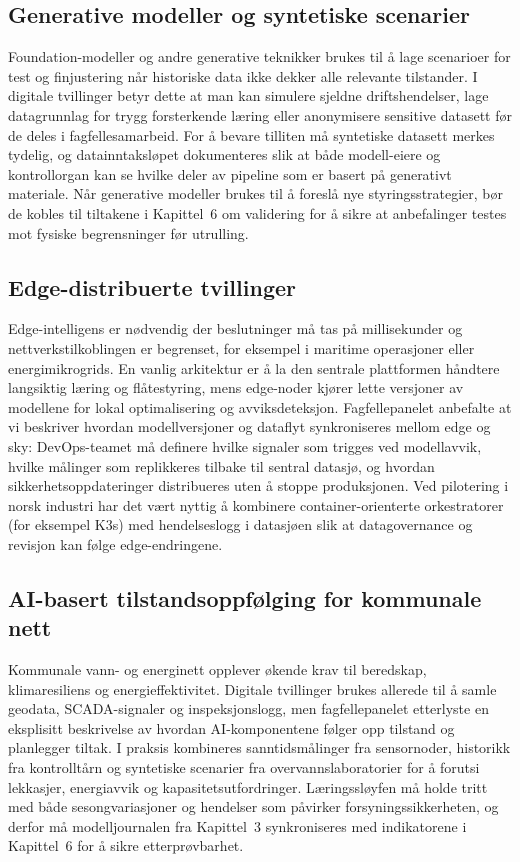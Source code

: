 \subsection{Generative modeller og syntetiske scenarier}
Foundation-modeller og andre generative teknikker brukes til å lage scenarioer for test og finjustering når historiske data ikke dekker alle relevante tilstander.\citep{bommasani2021opportunities} I digitale tvillinger betyr dette at man kan simulere sjeldne driftshendelser, lage datagrunnlag for trygg forsterkende læring eller anonymisere sensitive datasett før de deles i fagfellesamarbeid. For å bevare tilliten må syntetiske datasett merkes tydelig, og datainntaksløpet dokumenteres slik at både modell-eiere og kontrollorgan kan se hvilke deler av pipeline som er basert på generativt materiale. Når generative modeller brukes til å foreslå nye styringsstrategier, bør de kobles til tiltakene i Kapittel~6 om validering for å sikre at anbefalinger testes mot fysiske begrensninger før utrulling.

\subsection{Edge-distribuerte tvillinger}
Edge-intelligens er nødvendig der beslutninger må tas på millisekunder og nettverkstilkoblingen er begrenset, for eksempel i maritime operasjoner eller energimikrogrids.\citep{shi2016edge} En vanlig arkitektur er å la den sentrale plattformen håndtere langsiktig læring og flåtestyring, mens edge-noder kjører lette versjoner av modellene for lokal optimalisering og avviksdeteksjon. Fagfellepanelet anbefalte at vi beskriver hvordan modellversjoner og dataflyt synkroniseres mellom edge og sky: DevOps-teamet må definere hvilke signaler som trigges ved modellavvik, hvilke målinger som replikkeres tilbake til sentral datasjø, og hvordan sikkerhetsoppdateringer distribueres uten å stoppe produksjonen. Ved pilotering i norsk industri har det vært nyttig å kombinere container-orienterte orkestratorer (for eksempel K3s) med hendelseslogg i datasjøen slik at datagovernance og revisjon kan følge edge-endringene.

\subsection{AI-basert tilstandsoppfølging for kommunale nett}
Kommunale vann- og energinett opplever økende krav til beredskap, klimaresiliens og energieffektivitet. Digitale tvillinger brukes allerede til å samle geodata, SCADA-signaler og inspeksjonslogg, men fagfellepanelet etterlyste en eksplisitt beskrivelse av hvordan AI-komponentene følger opp tilstand og planlegger tiltak.\citep{norskvann2023digitaltvilling,oslo2023overvann} I praksis kombineres sanntidsmålinger fra sensornoder, historikk fra kontrolltårn og syntetiske scenarier fra overvannslaboratorier for å forutsi lekkasjer, energiavvik og kapasitetsutfordringer.\citep{asplan2023overvannslab} Læringssløyfen må holde tritt med både sesongvariasjoner og hendelser som påvirker forsyningssikkerheten, og derfor må modelljournalen fra Kapittel~3 synkroniseres med indikatorene i Kapittel~6 for å sikre etterprøvbarhet.

